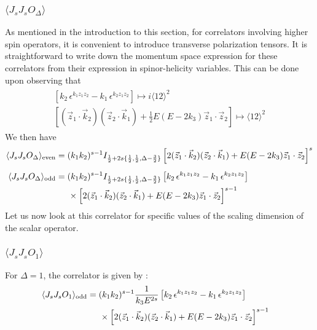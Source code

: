 \documentclass[a4paper,11pt]{article}
\begin{document}
\subsubsection*{$\langle J_sJ_sO_{\Delta}\rangle$}
As mentioned in the introduction to this section, for correlators involving higher spin operators, it is convenient to introduce transverse polarization tensors. It is straightforward to write down the momentum space expression for these correlators from their expression in spinor-helicity variables. This can be done upon observing that 
\begin{align}
    \begin{split}
        \left[k_2\,\epsilon^{ k_1 z_1 z_2}- k_1\,\epsilon^{k_2 z_1  z_2}\right] \mapsto i\langle 12 \rangle^2\\[5 pt]
        \left[(\vec{z}_1\cdot \vec{k}_2)( \vec{z}_2\cdot \vec{k}_1) +\frac{1}{2}E (E-2k_3)\vec{z}_1\cdot \vec{z}_2 \right] \mapsto \langle 12 \rangle^2
    \end{split}
\end{align}
We then have 
\begin{align}
\langle J_sJ_sO_{\Delta}\rangle_{\text{even}}&= (k_1 k_2)^{s-1}I_{\frac{1}{2}+2s\{\frac{1}{2},\frac{1}{2},\Delta-\frac{3}{2}\}}\left[2(\vec{z}_1\cdot \vec{k}_2)( \vec{z}_2\cdot \vec{k}_1) +E (E-2k_3)\vec{z}_1\cdot \vec{z}_2 \right]^{s}\\[5 pt]
\langle J_sJ_sO_{\Delta}\rangle_{\text{odd}}&=(k_1 k_2)^{s-1}I_{\frac{1}{2}+2s\{\frac{1}{2},\frac{1}{2},\Delta-\frac{3}{2}\}}\left[k_2\,\epsilon^{ k_1 z_1 z_2}- k_1\,\epsilon^{k_2 z_1  z_2}\right]\cr
&\hspace{.5cm}\times \left[2(\vec{z}_1\cdot \vec{k}_2)( \vec{z}_2\cdot \vec{k}_1) +E (E-2k_3)\vec{z}_1\cdot \vec{z}_2 \right]^{s-1}
\end{align}
Let us now look at this correlator for specific values of the scaling dimension of the scalar operator.
\subsubsection*{$\langle J_sJ_sO_{1}\rangle$}
For $\Delta=1$, the correlator is given by :
\begin{align}
\langle J_sJ_sO_{1}\rangle_{\text{odd}}&=(k_1 k_2)^{s-1}\frac{1}{k_3 E^{2s}}\left[k_2\,\epsilon^{ k_1 z_1 z_2}- k_1\,\epsilon^{k_2 z_1  z_2}\right]\cr
&\hspace{.5cm}\times \left[2(\vec{z}_1\cdot \vec{k}_2)( \vec{z}_2\cdot \vec{k}_1) +E (E-2k_3)\vec{z}_1\cdot \vec{z}_2 \right]^{s-1}
\end{align}
\end{document}
